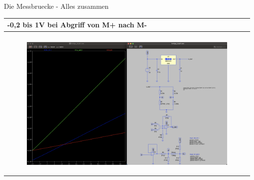 \begin{frame}[t]{Die Messbruecke - Alles zusammen}

    \begin{spacing}{0.9} \begin{tiny}
            \begin{table}[h!]
                \begin{tabular}{p{10cm} }
                    \hline
                    \textbf{-0,2 bis 1V bei Abgriff von M+ nach M-} \\
                    \hline                                          \\
                    \begin{minipage}{\textwidth}
                        \begin{figure}
                            \includegraphics[width=\linewidth]{pictures/complete_2.png}
                        \end{figure}
                    \end{minipage}
                \end{tabular}

            \end{table}

        \end{tiny} \end{spacing}

\end{frame}